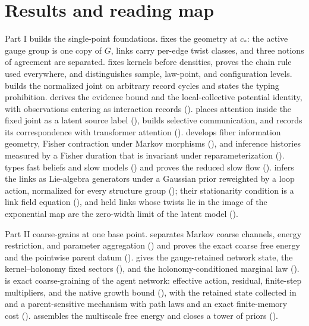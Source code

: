 \section{Results and reading map}
\label{sec:intro-reading-map}

Part I builds the single-point foundations.  fixes the geometry at $c_*$: the active gauge
group is one copy of $G$, links carry per-edge twist classes, and three notions of agreement are separated.
 fixes kernels before densities, proves the chain rule used everywhere, and
distinguishes sample, law-point, and configuration levels.  builds the normalized joint
on arbitrary record cycles and states the typing prohibition.  derives the evidence bound and
the local-collective potential identity, with observations entering as interaction records
().  places attention inside
the fixed joint as a latent source label (), builds selective communication,
and records its correspondence with transformer attention ().
 develops fiber information geometry, Fisher contraction under Markov
morphisms (), and inference histories measured by a Fisher duration that is
invariant under reparameterization ().  types
fast beliefs and slow models () and proves the reduced slow flow
().  infers the links as Lie-algebra generators under a
Gaussian prior reweighted by a loop action, normalized for every structure group
(); their stationarity condition is a link field equation
(), and held links whose twists lie in the image of the exponential map
are the zero-width limit of the latent model ().

Part II coarse-grains at one base point.  separates Markov coarse channels, energy
restriction, and parameter aggregation () and proves the exact coarse free
energy and the pointwise parent datum ().
 gives the gauge-retained network state, the kernel--holonomy fixed sectors
(), and the holonomy-conditioned marginal law
().  is exact coarse-graining of the agent
network: effective action, residual, finite-step multipliers, and the native growth bound
(),
with the retained state collected in  and a parent-sensitive mechanism with
path laws and an exact finite-memory cost ().
 assembles the multiscale free energy and closes a tower of priors
().

